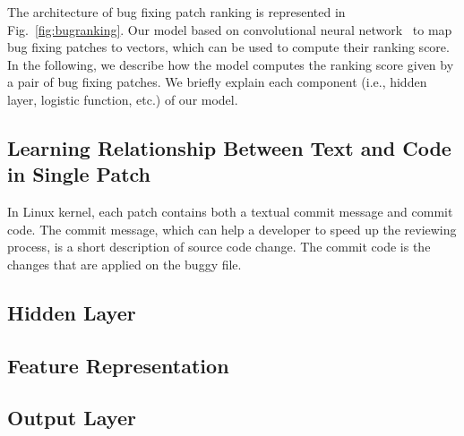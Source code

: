 The architecture of bug fixing patch ranking is represented in Fig.~\ref{fig:bugranking}. Our model based on convolutional neural network~\cite{lecun1995convolutional} to map bug fixing patches to vectors, which can be used to compute their ranking score. In the following, we describe how the model computes the ranking score given by a pair of bug fixing patches. We briefly explain each component (i.e., hidden layer, logistic function, etc.) of our model.

\subsection{Learning Relationship Between Text and Code in Single Patch}
\label{sec:learningTextandCode}
In Linux kernel, each patch contains both a textual commit message and commit code. The commit message, which can help a developer to speed up the reviewing process, is a short description of source code change. The commit code is the changes that are applied on the buggy file. 


\subsection{Hidden Layer}
\label{sec:hiddenlayer}

\subsection{Feature Representation}
\label{sec:feature}

\subsection{Output Layer}
\label{sec:output}

